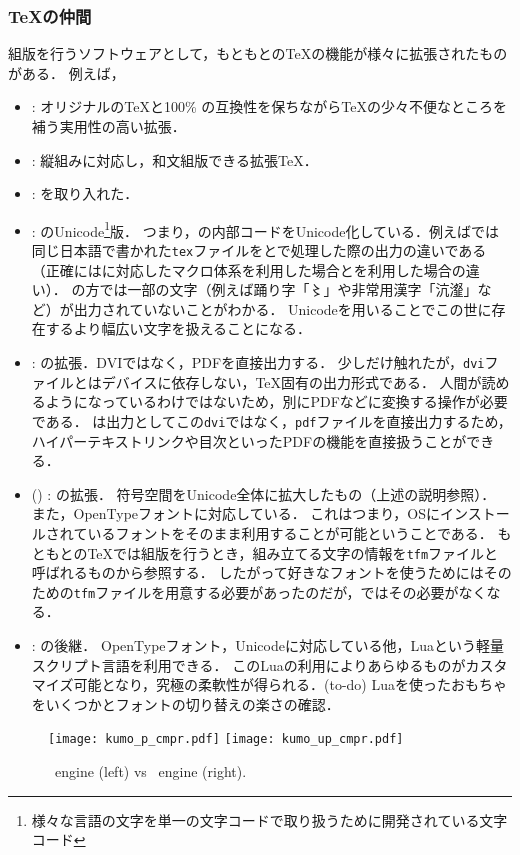 \documentclass[./main]{subfiles}
\begin{document}
\subsubsection{\TeX の仲間}
\noindent
組版を行うソフトウェアとして，もともとの\TeX の機能が様々に拡張されたものがある．
例えば，
\begin{itemize}
  \item \eTeX : オリジナルの\TeX と100\% の互換性を保ちながら\TeX の少々不便なところを補う実用性の高い拡張．
  \item \pTeX : 縦組みに対応し，和文組版できる拡張\TeX．
  \item \epTeX : \eTeX を取り入れた\pTeX．
  \item \upTeX : \pTeX のUnicode\footnote{様々な言語の文字を単一の文字コードで取り扱うために開発されている文字コード\supercite{Unicode_Wikipedia,師茂樹2009unicode}}版．
  つまり，\pTeX の内部コードをUnicode化している．例えばでは同じ日本語で書かれた\verb|tex|ファイルを\pTeX と\upTeX で処理した際の出力の違いである（正確には\pTeX に対応したマクロ体系\pLaTeX を利用した場合と\upLaTeX を利用した場合の違い）．
  \pTeX の方では一部の文字（例えば踊り字「〻」や非常用漢字「沆瀣」など）が出力されていないことがわかる．
  Unicodeを用いることでこの世に存在するより幅広い文字を扱えることになる．
  \item \pdfTeX : \eTeX の拡張．DVIではなく，PDFを直接出力する．
  少しだけ触れたが，\verb|dvi|ファイルとはデバイスに依存しない，\TeX 固有の出力形式である．
  人間が読めるようになっているわけではないため，別にPDFなどに変換する操作が必要である．
  \pdfTeX は出力としてこの\verb|dvi|ではなく，\verb|pdf|ファイルを直接出力するため，ハイパーテキストリンクや目次といったPDFの機能を直接扱うことができる．
  \item \XeTeX ()\supercite{XeTeX_Wikipedia,XeTeX_TeXWiki} : \eTeX の拡張．
  符号空間をUnicode全体に拡大したもの（上述\upTeX の説明参照）．
  また，OpenTypeフォントに対応している．
  これはつまり，OSにインストールされているフォントをそのまま利用することが可能ということである\supercite{XeTeX_nopoleos}．
  もともとの\TeX では組版を行うとき，組み立てる文字の情報を\verb|tfm|ファイルと呼ばれるものから参照する．
  したがって好きなフォントを使うためにはそのための\verb|tfm|ファイルを用意する必要があったのだが，\XeTeX ではその必要がなくなる．
  \item \LuaTeX : \pdfTeX の後継．
  OpenTypeフォント，Unicodeに対応している他，Luaという軽量スクリプト言語を利用できる．
  このLuaの利用によりあらゆるものがカスタマイズ可能となり，究極の柔軟性が得られる\supercite{八登2010日本人}．(to-do) Luaを使ったおもちゃをいくつかとフォントの切り替えの楽さの確認．
\end{itemize}
\begin{figure}[btph]
  \centering
  \texttt{[image: kumo\_p\_cmpr.pdf]}
  \hspace{0.1\linewidth}
  \texttt{[image: kumo\_up\_cmpr.pdf]}
  \caption{\pTeX\ engine (left) vs \upTeX\ engine (right).\supercite{幸田1987雲}}
  \label{fig:pTeX_vs_upTeX}
\end{figure}
\end{document}
